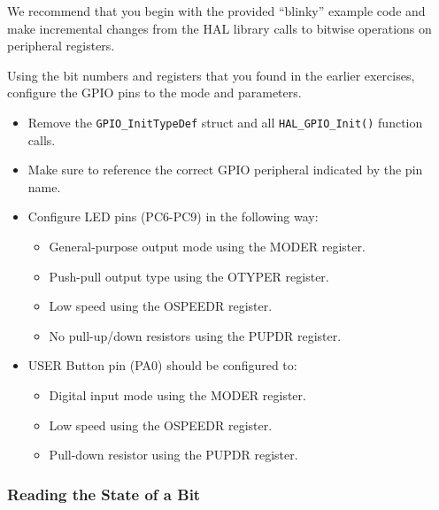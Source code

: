 \documentclass[openany,11pt,fleqn]{book} %
\begin{document}
\newpage
\begin{exercise}
    We recommend that you begin with the provided ``blinky'' example code and make incremental changes from the HAL library calls to bitwise operations on peripheral registers.
    
    
    Using the bit numbers and registers that you found in the earlier exercises, configure the GPIO pins to the mode and parameters. 
    \begin{itemize}
        \item Remove the \texttt{GPIO\_InitTypeDef} struct and all \texttt{HAL\_GPIO\_Init()} function calls.
        \item Make sure to reference the correct GPIO peripheral indicated by the pin name. 
        \item Configure LED pins (PC6-PC9) in the following way:
        \begin{itemize}
            \item General-purpose output mode using the MODER register. 
            \item Push-pull output type using the OTYPER register.
            \item Low speed using the OSPEEDR register. 
            \item No pull-up/down resistors using the PUPDR register. 
        \end{itemize}
        \item USER Button pin (PA0) should be configured to:
        \begin{itemize}
            \item Digital input mode using the MODER register. 
            \item Low speed using the OSPEEDR register. 
            \item Pull-down resistor using the PUPDR register. 
        \end{itemize}
           
    \end{itemize}
\end{exercise}

\subsubsection{Reading the State of a Bit}
\end{document}
